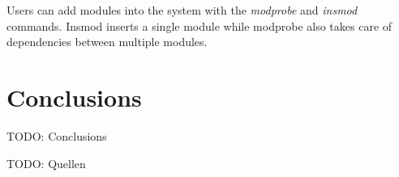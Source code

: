 \documentclass{sig-alternate-05-2015}
\begin{document}
Users can add modules into the system with the \emph{modprobe} and \emph{insmod} commands. Insmod inserts a single module while modprobe also takes care of dependencies between multiple modules.
\section{Conclusions}

TODO: Conclusions

TODO: Quellen



\balancecolumns{}
\end{document}
